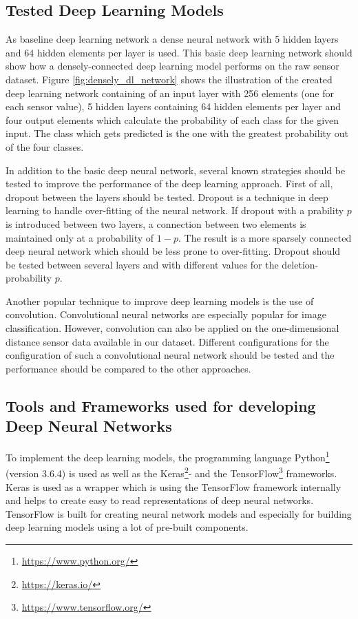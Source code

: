 \subsection{Tested Deep Learning Models}

As baseline deep learning network a dense neural network with 5 hidden layers and 64 hidden elements per layer is used. This basic deep learning network should show how a densely-connected deep learning model performs on the raw sensor dataset. Figure \ref{fig:densely_dl_network} shows the illustration of the created deep learning network containing of an input layer with 256 elements (one for each sensor value), 5 hidden layers containing 64 hidden elements per layer and four output elements which calculate the probability of each class for the given input. The class which gets predicted is the one with the greatest probability out of the four classes. 

In addition to the basic deep neural network, several known strategies should be tested to improve the performance of the deep learning approach. First of all, dropout between the layers should be tested. Dropout is a technique in deep learning to handle over-fitting of the neural network. If dropout with a prability $p$ is introduced between two layers, a connection between two elements is maintained only at a probability of $1-p$. The result is a more sparsely connected deep neural network which should be less prone to over-fitting. Dropout should be tested between several layers and with different values for the deletion-probability $p$.

Another popular technique to improve deep learning models is the use of convolution. Convolutional neural networks are especially popular for image classification. However, convolution can also be applied on the one-dimensional distance sensor data available in our dataset. Different configurations for the configuration of such a convolutional neural network should be tested and the performance should be compared to the other approaches.


\subsection{Tools and Frameworks used for developing Deep Neural Networks}

To implement the deep learning models, the programming language Python\footnote{\url{https://www.python.org/}} (version 3.6.4) is used as well as the Keras\footnote{\url{https://keras.io/}}- and the TensorFlow\footnote{\url{https://www.tensorflow.org/}} frameworks. Keras is used as a wrapper which is using the TensorFlow framework internally and helps to create easy to read representations of deep neural networks. TensorFlow is built for creating neural network models and especially for building deep learning models using a lot of pre-built components. 


